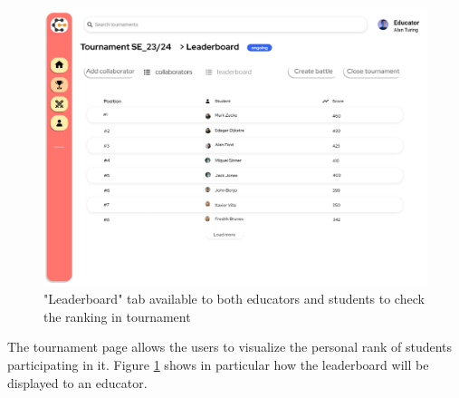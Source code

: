 \begin{figure}[H]
    \centering
    \includegraphics[width=1\textwidth]{Mockups/8_educator_tournament_leaderboard.png}
    \caption{"Leaderboard" tab available to both educators and students to check the ranking in tournament}
    \label{fig:leaderboard}
\end{figure}
\newpage
\hfill \break
The tournament page allows the users to visualize the personal rank of students participating in it. Figure \ref{fig:leaderboard} shows in particular how the leaderboard will be displayed to an educator.  \\ \\ \\ \\ \\ \\

